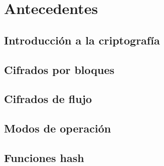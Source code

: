%
%

\chapter{Antecedentes}

\section{Introducción a la criptografía}

\section{Cifrados por bloques}

\section{Cifrados de flujo}

\section{Modos de operación}

\section{Funciones hash}
